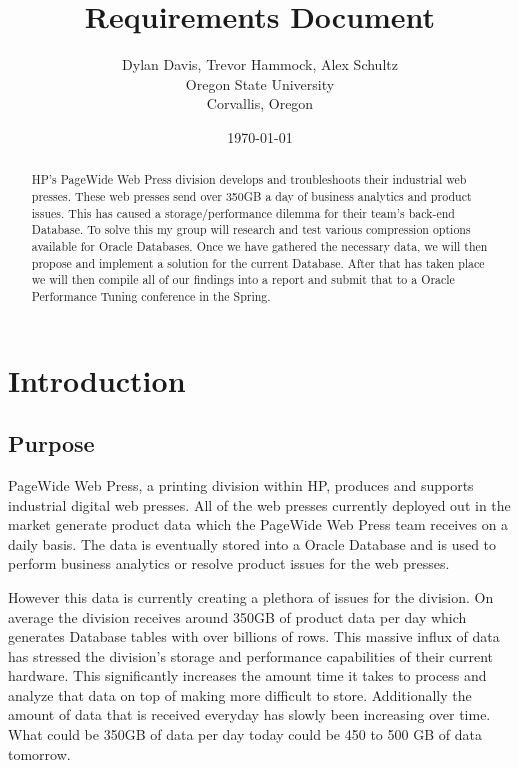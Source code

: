 \documentclass[10pt]{article}
\title{Requirements Document}
\author{
	Dylan Davis, Trevor Hammock, Alex Schultz \\
	Oregon State University\\
	Corvallis, Oregon
}
\date{\today}
\begin{document}
\begin{titlingpage}
\maketitle

\begin{abstract}

HP's PageWide Web Press division develops and troubleshoots their industrial web presses. These web presses send over 350GB a day of business analytics and product issues. This has caused a storage/performance dilemma for their team's back-end Database. To solve this my group will research and test various compression options available for Oracle Databases. Once we have gathered the necessary data, we will then propose and implement a solution for the current Database. After that has taken place we will then compile all of our findings into a report and submit that to a Oracle Performance Tuning conference in the Spring.

\end{abstract}
\end{titlingpage}


\tableofcontents
\clearpage


\section{Introduction}
\subsection{Purpose}

PageWide Web Press, a printing division within HP, produces and supports industrial digital web presses. All of the web presses currently deployed out in the market generate product data which the PageWide Web Press team receives on a daily basis. The data is eventually stored into a Oracle Database and is used to perform business analytics or resolve product issues for the web presses.

However this data is currently creating a plethora of issues for the division. On average the division receives around 350GB of product data per day which generates Database tables with over billions of rows. This massive influx of data has stressed the division's storage and performance capabilities of their current hardware. This significantly increases the amount time it takes to process and analyze that data on top of making more difficult to store. Additionally the amount of data that is received everyday has slowly been increasing over time. What could be 350GB of data per day today could be 450 to 500 GB of data tomorrow.
\end{document}
